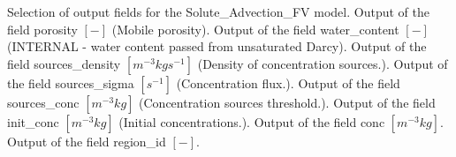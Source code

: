 \begin{SelectionType}
	{}
	{{{Selection of output fields for the Solute{\_}Advection{\_}FV model.}}}
		\KeyItem
			{}
			{{{Output of the field porosity }{$[-]$}{ (Mobile porosity).}}}
		\KeyItem
			{}
			{{{Output of the field water{\_}content }{$[-]$}{ (INTERNAL - water content passed from unsaturated Darcy).}}}
		\KeyItem
			{}
			{{{Output of the field sources{\_}density }{$[m^{-3}kgs^{-1}]$}{ (Density of concentration sources.).}}}
		\KeyItem
			{}
			{{{Output of the field sources{\_}sigma }{$[s^{-1}]$}{ (Concentration flux.).}}}
		\KeyItem
			{}
			{{{Output of the field sources{\_}conc }{$[m^{-3}kg]$}{ (Concentration sources threshold.).}}}
		\KeyItem
			{}
			{{{Output of the field init{\_}conc }{$[m^{-3}kg]$}{ (Initial concentrations.).}}}
		\KeyItem
			{}
			{{{Output of the field conc }{$[m^{-3}kg]$}{.}}}
		\KeyItem
			{}
			{{{Output of the field region{\_}id }{$[-]$}{.}}}
\end{SelectionType}
